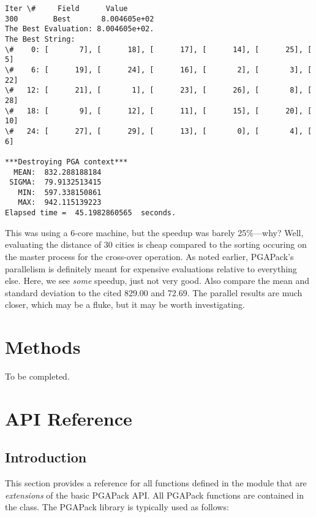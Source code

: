\documentclass[letterpaper,11pt,english]{sphinxmanual}
\begin{document}
\begin{Verbatim}[commandchars=\\\{\}]
Iter \#     Field      Value
300        Best       8.004605e+02
The Best Evaluation: 8.004605e+02.
The Best String:
\#    0: [       7], [      18], [      17], [      14], [      25], [       5]
\#    6: [      19], [      24], [      16], [       2], [       3], [      22]
\#   12: [      21], [       1], [      23], [      26], [       8], [      28]
\#   18: [       9], [      12], [      11], [      15], [      20], [      10]
\#   24: [      27], [      29], [      13], [       0], [       4], [       6]

***Destroying PGA context***
  MEAN:  832.288188184
 SIGMA:  79.9132513415
   MIN:  597.338150861
   MAX:  942.115139223
Elapsed time =  45.1982860565  seconds.
\end{Verbatim}

This was using a 6-core machine, but the speedup was barely
25\%---why?  Well, evaluating the distance of 30 cities is
cheap compared to the sorting occuring on the master process
for the cross-over operation.  As noted earlier, PGAPack's
parallelism is definitely meant for expensive evaluations
relative to everything else.  Here, we see \emph{some} speedup,
just not very good.  Also compare the mean and standard
deviation to the cited 829.00 and 72.69.  The parallel results
are much closer, which may be a fluke, but it may be worth
investigating.


\chapter{Methods}
\label{methods:sec-methods}\label{methods::doc}\label{methods:methods}
To be completed.


\chapter{API Reference}
\label{api_reference:api-reference}\label{api_reference:sec-reference}\label{api_reference::doc}

\section{Introduction}
\label{api_reference:introduction}
This section provides a reference for all functions
defined in the  module that are \emph{extensions} of the basic
PGAPack API.  All PGAPack functions are contained in the
 class.  The PGAPack library is typically
used as follows:
\end{document}

